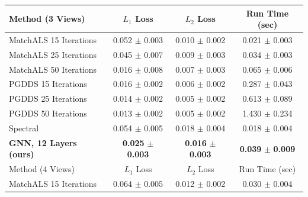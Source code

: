 \documentclass[10pt,twocolumn,letterpaper]{article}
\begin{document}
\begin{table}
\begin{center}
\begin{tabular}{|l|c|c|c|}
\hline
Method (3 Views)                                          & $L_1$ Loss                          & $L_2$ Loss                          & Run Time (sec)                      \\
\hline\hline
MatchALS \cite{zhou2015multi} 15 Iterations               & 0.052 $\pm$ 0.003                   & 0.010 $\pm$ 0.002                   & 0.021 $\pm$ 0.003                   \\
MatchALS \cite{zhou2015multi} 25 Iterations               & 0.045 $\pm$ 0.007                   & 0.009 $\pm$ 0.003                   & 0.034 $\pm$ 0.003                   \\
MatchALS \cite{zhou2015multi} 50 Iterations               & 0.016 $\pm$ 0.008                   & 0.007 $\pm$ 0.003                   & 0.065 $\pm$ 0.006                   \\ \hline
PGDDS \cite{leonardos2016distributed} 15 Iterations       & 0.016 $\pm$ 0.002                   & 0.006 $\pm$ 0.002                   & 0.287 $\pm$ 0.043                   \\
PGDDS \cite{leonardos2016distributed} 25 Iterations       & 0.014 $\pm$ 0.002                   & 0.005 $\pm$ 0.002                   & 0.613 $\pm$ 0.089                   \\
PGDDS \cite{leonardos2016distributed} 50 Iterations       & 0.013 $\pm$ 0.002                   & 0.005 $\pm$ 0.002                   & 1.430 $\pm$ 0.234                   \\ \hline
Spectral                                                  & 0.054 $\pm$ 0.005                   & 0.018 $\pm$ 0.004                   & 0.018 $\pm$ 0.004                   \\ \hline 
\textbf{GNN, 12 Layers (ours)}                            & \textbf{0.025} $\pm$ \textbf{0.003} & \textbf{0.016} $\pm$ \textbf{0.003} & \textbf{0.039} $\pm$ \textbf{0.009} \\
\hline\hline
Method (4 Views)                                                         & $L_1$ Loss                          & $L_2$ Loss                          & Run Time (sec)                     \\
\hline\hline
MatchALS \cite{zhou2015multi} 15 Iterations                              & 0.064 $\pm$ 0.005                   & 0.012 $\pm$ 0.002                   & 0.030 $\pm$ 0.004                   \\

\end{tabular}
\end{center}
\end{table}
\end{document}
